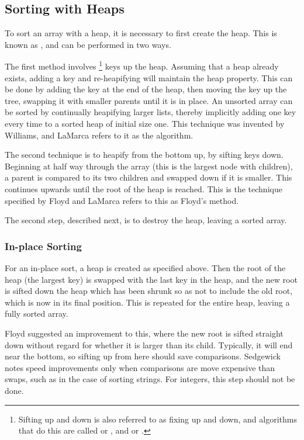 \subsection{Sorting with Heaps}
To sort an array with a heap, it is necessary to first create the heap. This is
known as , and can be performed in two ways.

The first method involves \footnote{Sifting up and down is also
referred to as fixing up and down, and algorithms that do this are called
 or , and  or .} keys up the heap.
Assuming that a heap already exists, adding a key and re-heapifying will
maintain the heap property. This can be done by adding the key at the end of
the heap, then moving the key up the tree, swapping it with smaller parents
until it is in place. An unsorted array can be sorted by continually heapifying
larger lists, thereby implicitly adding one key every time to a sorted heap of
initial size one. This technique was invented by Williams, and LaMarca refers to
it as the  algorithm.

The second technique is to heapify from the bottom up, by sifting keys down.
Beginning at half way through the array (this is the largest node with children),
a parent is compared to its two children and swapped down if it is smaller. This
continues upwards until the root of the heap is reached. This is the technique
specified by Floyd and LaMarca refers to this as Floyd's method.

The second step, described next, is to destroy the heap, leaving a sorted array.

\subsubsection{In-place Sorting}
For an in-place sort, a heap is created as specified above. Then the root of the
heap (the largest key) is swapped with the last key in the heap, and the new
root is sifted down the heap which has been shrunk so as not to include the old
root, which is now in its final position. This is repeated for the entire heap,
leaving a fully sorted array.

Floyd suggested an improvement to this, where the new root is sifted straight
down without regard for whether it is larger than its child. Typically, it will
end near the bottom, so sifting up from here should save comparisons. Sedgewick
notes speed improvements only when comparisons are move expensive than swaps,
such as in the case of sorting strings. For integers, this step should not be
done.

